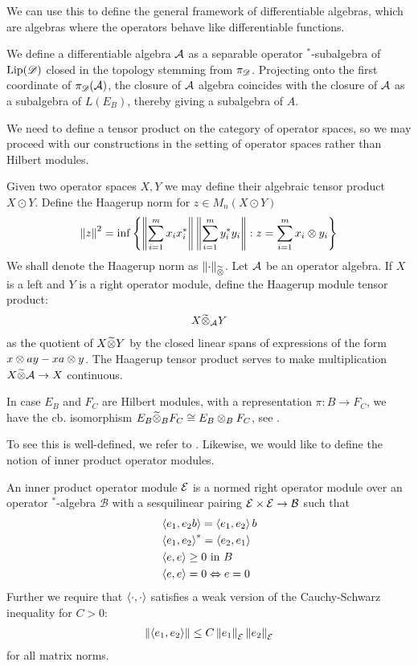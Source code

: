 We can use this to define the general framework of differentiable algebras, which are algebras where the operators behave like differentiable functions. 
\begin{definition}
We define a differentiable algebra $\mathcal{A}$ as a separable operator $^*$-subalgebra of $\operatorname{Lip}(\mathscr{D})$ closed in the topology stemming from $\pi_{\mathscr{D}}$. Projecting onto the first coordinate of $\pi_{\mathscr{D}}(\mathcal{A})$, the \Cstar closure of $\mathcal{A}$ algebra coincides with the closure of $\mathcal{A}$ as a subalgebra of $L(E_B)$, thereby giving a subalgebra of $A$. 
\end{definition}
We need to define a tensor product on the category of operator spaces, so we may proceed with our constructions in the setting of operator spaces rather than Hilbert \Cstar modules. 
\begin{definition}
	Given two operator spaces $X,Y$ we may define their algebraic tensor product $X\odot Y$. Define the Haagerup norm for $z\in M_n(X\odot Y)$
	\begin{align*}
		\left \Vert z \right \Vert^2=\inf \left \{ \left \Vert \sum_{i=1}^m  x_ix_i^* \right \Vert \left \Vert \sum_{i=1}^m y_i^*y_i \right \Vert : z=\sum_{i=1}^m x_i\otimes y_i \right \}
	\end{align*}
	We shall denote the Haagerup norm as $\left \Vert \cdot \right \Vert_{\widetilde{\otimes}}$. Let $\mathcal{A}$ be an operator algebra. If $X$ is a left and $Y$ is a right operator module, define the Haagerup module tensor product:
	\begin{align*}
		X\widetilde{\otimes}_{\mathcal{A}} Y
	\end{align*}
	as the quotient of $X\widetilde{\otimes} Y$ by the closed linear spans of expressions of the form $x\otimes ay-xa\otimes y$. The Haagerup tensor product serves to make multiplication $X\widetilde{\otimes} \mathcal{A}\to X$ continuous. 
\end{definition}
\begin{remark}
	In case $E_B$ and $F_C$ are Hilbert modules, with a representation $\pi:B\to F_C$, we have the cb. isomorphism $E_B\widetilde{\otimes}_B F_C \cong E_B\otimes_B F_C$, see \cite{blecher}.
\end{remark}
To see this is well-defined, we refer to \cite{blecher}. 
Likewise, we would like to define the notion of inner product operator modules. 
\begin{definition}
	An inner product operator module $\mathcal{E}$ is a normed right operator module over an operator $^*$-algebra $\mathcal{B}$ with a sesquilinear pairing $\mathcal{E}\times \mathcal{E}\to \mathcal{B}$ such that 
	\begin{align*}
	&\left \langle e_1,e_2b \right \rangle=\left \langle e_1,e_2 \right \rangle b \\
	&\left \langle e_1,e_2 \right \rangle^*=\left \langle e_2,e_1 \right \rangle \\
	&\left \langle e,e \right \rangle\geq 0 \text{ in } B\\
	&\left \langle e,e \right \rangle=0 \Leftrightarrow e=0
	\end{align*}
	Further we require that $\left \langle \cdot,\cdot \right \rangle$ satisfies a weak version of the Cauchy-Schwarz inequality for $C>0$: \begin{align*} \left \Vert \left \langle e_1,e_2 \right \rangle \right \Vert\leq C \left \Vert e_1 \right \Vert_{\mathcal{E}}\left \Vert e_2 \right \Vert_{\mathcal{E}} \end{align*} for all matrix norms. 
\end{definition}
